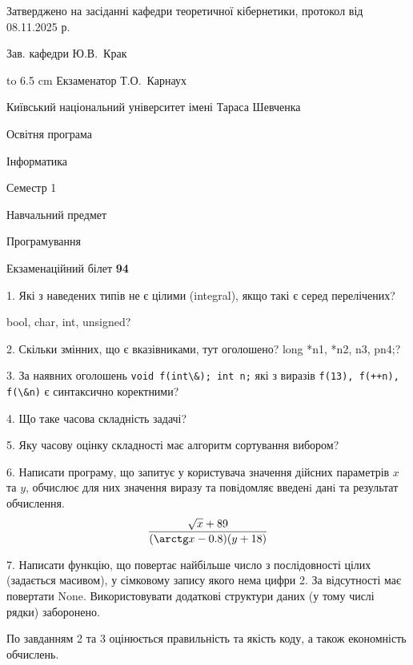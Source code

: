 \documentclass[12pt, ukrainian]{article}
\def\code#1{\Verb!#1!}
\begin{document}
{\smallskip\smallskip \begin {scriptsize} Затверджено на засіданні кафедри теоретичної кібернетики, протокол   від   08.11.2025 р.\par\smallskip\smallskip\smallskip\smallskip
{\parbox {6.5 cm} {Зав. кафедри \dotfill Ю.В.~Крак}}\hspace {0.7cm} {\hbox to 6.5 cm { Екзаменатор \dotfill Т.О.~Карнаух}} \end{scriptsize}}
\vspace{0.9cm}
{{\begin {scriptsize}\par
{ \center  Київський національний університет імені Тараса Шевченка \par}
{\parbox {5 cm}{Освітня програма \hfill}{\parbox {7 cm}{Інформатика\hfill}}\parbox {6 cm}{\hfill Семестр 1}}\par
{\parbox {5 cm} {Навчальний предмет \hfill}\parbox {7 cm}{Програмування \hfill}\parbox {6cm}{\hfill}\par}\vspace{-15pt} \end{scriptsize}}{\center Екзаменаційний білет \No \textbf { 94 }\par}}
{%
1. Які з наведених типів не є цілими (integral), якщо такі є серед перелічених?

bool, char, int, unsigned?
\par
\vspace{2mm}
2. Скільки змінних, що є вказівниками, тут оголошено?
long *n1, *n2, n3, pn4;?
\par
\vspace{2mm}
3. За наявних оголошень \code{void f(int\&); int n;} які з виразів \code{f(13), f(++n), f(\&n)} є синтаксично коректними?
\par
\vspace{2mm}
4. Що таке часова складність задачі?
\par
\vspace{2mm}
5. Яку часову оцінку складності має алгоритм сортування вибором?
\par
\vspace{2mm}
6. Написати програму, що запитує у користувача значення дійсних параметрів $x$ та $y$, обчислює для них значення виразу та повiдомляє введенi данi та результат обчислення.
$$\frac{\sqrt x + 89}{(\arctg x - 0.8) (y + 18)}$$ 

\par
7. Написати функцію, що повертає найбільше число з послідовності цілих (задається масивом), у сімковому запису якого нема цифри 2. За відсутності має повертати None. Використовувати додаткові структури даних (у тому числі рядки) заборонено.

По завданням 2 та 3 оцінюється правильність та якість коду, а також економність обчислень.

}
\end{document}
